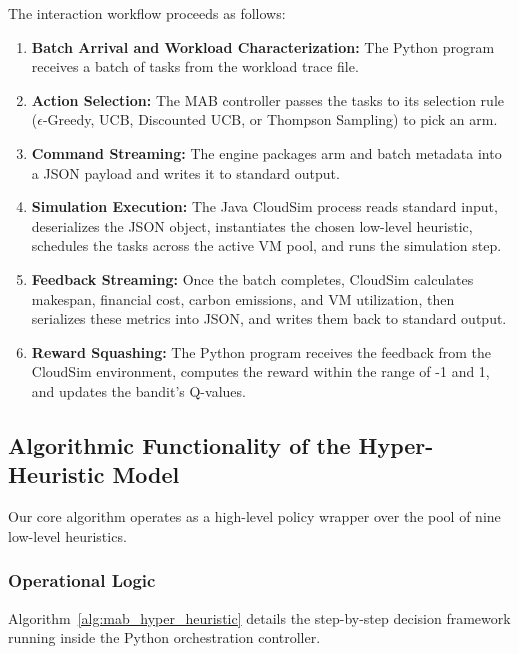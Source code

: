 The interaction workflow proceeds as follows:
\begin{enumerate}
    \item \textbf{Batch Arrival and Workload Characterization:} The Python program receives a batch of tasks from the workload trace file.
    \item \textbf{Action Selection:} The MAB controller passes the tasks to its selection rule ($\epsilon$-Greedy, UCB, Discounted UCB, or Thompson Sampling) to pick an arm.
    \item \textbf{Command Streaming:} The engine packages arm and batch metadata into a  JSON payload and writes it to standard output.
    \item \textbf{Simulation Execution:} The Java CloudSim process reads standard input, deserializes the JSON object, instantiates the chosen low-level heuristic, schedules the tasks across the active VM pool, and runs the simulation step.
    \item \textbf{Feedback Streaming:} Once the batch completes, CloudSim calculates makespan, financial cost, carbon emissions, and VM utilization, then serializes these metrics into JSON, and writes them back to standard output.
    \item \textbf{Reward Squashing:} The Python program receives the feedback from the CloudSim environment, computes the reward within the range of -1 and 1, and updates the bandit's Q-values.
\end{enumerate}

\subsection{Algorithmic Functionality of the Hyper-Heuristic Model}
Our core algorithm operates as a high-level policy wrapper over the pool of nine low-level heuristics. 

\subsubsection{Operational Logic}
Algorithm~\ref{alg:mab_hyper_heuristic} details the step-by-step decision framework running inside the Python orchestration controller.


